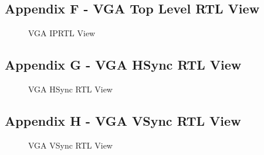 \documentclass[a4paper,12pt]{article}
\begin{document}
\subsection{Appendix F - VGA Top Level RTL View}
\begin{figure}[H]
	\centering
	\caption{VGA IPRTL View}
\end{figure}
\begin{flushleft}
\-
\end{flushleft}
\newpage
\subsection{Appendix G - VGA HSync RTL View}
\begin{figure}[H]
	\centering
	\caption{VGA HSync RTL View}
\end{figure}
\begin{flushleft}
\-
\end{flushleft}
\subsection{Appendix H - VGA VSync RTL View}
\begin{figure}[H]
	\centering
	\caption{VGA VSync RTL View}
\end{figure}
\newpage
\end{document}
